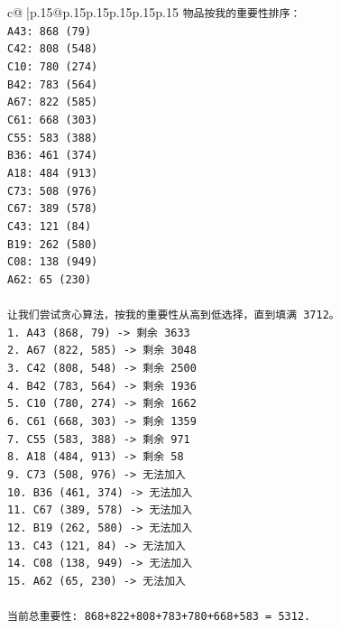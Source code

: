 \documentclass{article}
\begin{document}
{\begin{supertabular}{c@{$\;$}|p{.15\linewidth}@{}p{.15\linewidth}p{.15\linewidth}p{.15\linewidth}p{.15\linewidth}p{.15\linewidth}}
{{{\texttt{物品按我的重要性排序：} \\
\texttt{A43: 868 (79)} \\
\texttt{C42: 808 (548)} \\
\texttt{C10: 780 (274)} \\
\texttt{B42: 783 (564)} \\
\texttt{A67: 822 (585)} \\
\texttt{C61: 668 (303)} \\
\texttt{C55: 583 (388)} \\
\texttt{B36: 461 (374)} \\
\texttt{A18: 484 (913)} \\
\texttt{C73: 508 (976)} \\
\texttt{C67: 389 (578)} \\
\texttt{C43: 121 (84)} \\
\texttt{B19: 262 (580)} \\
\texttt{C08: 138 (949)} \\
\texttt{A62: 65 (230)} \\
\\ 
\texttt{让我们尝试贪心算法，按我的重要性从高到低选择，直到填满 3712。} \\
\texttt{1. A43 (868, 79) {-}> 剩余 3633} \\
\texttt{2. A67 (822, 585) {-}> 剩余 3048} \\
\texttt{3. C42 (808, 548) {-}> 剩余 2500} \\
\texttt{4. B42 (783, 564) {-}> 剩余 1936} \\
\texttt{5. C10 (780, 274) {-}> 剩余 1662} \\
\texttt{6. C61 (668, 303) {-}> 剩余 1359} \\
\texttt{7. C55 (583, 388) {-}> 剩余 971} \\
\texttt{8. A18 (484, 913) {-}> 剩余 58} \\
\texttt{9. C73 (508, 976) {-}> 无法加入} \\
\texttt{10. B36 (461, 374) {-}> 无法加入} \\
\texttt{11. C67 (389, 578) {-}> 无法加入} \\
\texttt{12. B19 (262, 580) {-}> 无法加入} \\
\texttt{13. C43 (121, 84) {-}> 无法加入} \\
\texttt{14. C08 (138, 949) {-}> 无法加入} \\
\texttt{15. A62 (65, 230) {-}> 无法加入} \\
\\ 
\texttt{当前总重要性: 868+822+808+783+780+668+583 = 5312.} \\
}}}
\end{supertabular}}
\end{document}

